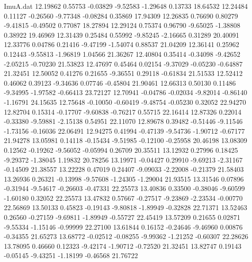 \begin{filecontents}{ImuA.dat}
  12.19862    0.55753   -0.03829   -9.52583   -1.29648    0.13733   18.64532
  12.24484    0.11127   -0.26560   -9.77348   -0.08284    0.35869   17.94309
  12.26835    0.76690    0.80279   -9.41815   -0.49502    0.77087   18.27894
  12.29124    0.75374    0.96790   -9.65025   -1.38808    0.38922   19.46969
  12.31439    0.25484    0.55992   -9.85245   -2.16665    0.31289   20.40091
  12.33776    0.04786    0.21416   -9.47199   -1.54074    0.88537   21.04209
  12.36141    0.25962    0.12443   -9.55813   -1.96819    1.04566   21.36267
  12.40804    0.35414   -0.34098   -9.42652   -2.05215   -0.70230   21.53823
  12.47697    0.45464    0.02154   -9.37029   -0.05230   -0.64887   21.32451
  12.50052    0.41276    0.21655   -9.36551    0.29118   -0.61834   21.51533
  12.52412    0.46062    0.39123   -9.34636    0.07746   -0.45804   21.90461
  12.66313    0.50130    0.11486   -9.34995   -1.97582   -0.66413   23.72127
  12.70941   -0.04786   -0.02034   -9.82014   -0.86140   -1.16791   24.15635
  12.75648   -0.10050   -0.60419   -9.48754   -0.05230    0.32052   22.94270
  12.82704    0.15314   -0.17707   -9.60838   -0.76217    0.55715   22.16414
  12.87326    0.22014   -0.33380   -9.59881   -2.15138    0.54951   22.11070
  12.89678    0.39482   -0.51446   -9.11546   -1.73156   -0.16036   22.06491
  12.94275    0.41994   -0.47139   -9.54736   -1.90712   -0.67177   21.94278
  13.05981    0.14118   -0.15434   -9.51985   -0.12100   -0.25958   20.46198
  13.08309    0.12562   -0.19262   -9.56052   -0.05994    0.26709   20.35511
  13.12932    0.27996    0.18425   -9.29372   -1.38045    1.19832   20.78256
  13.19971   -0.04427    0.29910   -9.69213   -2.31167   -0.14509   21.38557
  13.22228    0.47019    0.24407   -9.09033   -2.22008   -0.21379   21.58403
  13.26936    0.26321   -0.13998   -9.57608   -1.24305   -1.29004   21.93515
  13.31546    0.07896   -0.31944   -9.54617   -0.26603   -0.47331   22.25573
  13.40836    0.33500   -0.38046   -9.60599   -1.60180    0.32052   22.25573
  13.47832    0.57667   -0.27517   -9.23869   -2.23534   -0.00770   22.56869
  13.50133    0.45823   -0.19143   -9.80818   -1.89949   -0.32828   22.71371
  13.52463    0.26560   -0.27159   -9.69811   -1.89949   -0.55727   22.45419
  13.57209    0.21655    0.02871   -9.55334   -1.15146   -0.99999   22.27100
  13.61844    0.16152   -0.24646   -9.46960    0.00876   -0.34355   21.65273
  13.68772   -0.02512   -0.08255   -9.99362   -1.21252   -0.60307   22.28626
  13.78095    0.46660    0.12323   -9.42174   -1.90712   -0.72520   21.32451
  13.82747    0.19143   -0.05145   -9.43251   -1.18199   -0.46568   21.76722

\end{filecontents}
